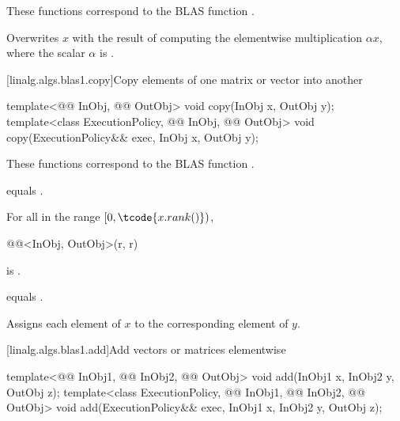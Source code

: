 \begin{itemdescr}
\pnum
\begin{note}
These functions correspond to the BLAS function \supercite{blas1}.
\end{note}

\pnum
\effects
Overwrites $x$ with the result of
computing the elementwise multiplication $\alpha x$,
where the scalar $\alpha$ is .
\end{itemdescr}

[linalg.algs.blas1.copy]{Copy elements of one matrix or vector into another}

\begin{itemdecl}
template<@@ InObj, @@ OutObj>
  void copy(InObj x, OutObj y);
template<class ExecutionPolicy, @@ InObj, @@ OutObj>
  void copy(ExecutionPolicy&& exec, InObj x, OutObj y);
\end{itemdecl}

\begin{itemdescr}
\pnum
\begin{note}
These functions correspond to the BLAS function .
\end{note}

\pnum
\constraints
{} equals .

\pnum
\mandates
For all  in the range $[ 0, \tcode{x.rank()})$,
\begin{codeblock}
@@<InObj, OutObj>(r, r)
\end{codeblock}
is .

\pnum
\expects
{} equals .

\pnum
\effects
Assigns each element of $x$ to the corresponding element of $y$.
\end{itemdescr}

[linalg.algs.blas1.add]{Add vectors or matrices elementwise}

\begin{itemdecl}
template<@@ InObj1, @@ InObj2, @@ OutObj>
  void add(InObj1 x, InObj2 y, OutObj z);
template<class ExecutionPolicy, @@ InObj1, @@ InObj2, @@ OutObj>
  void add(ExecutionPolicy&& exec,
           InObj1 x, InObj2 y, OutObj z);
\end{itemdecl}


